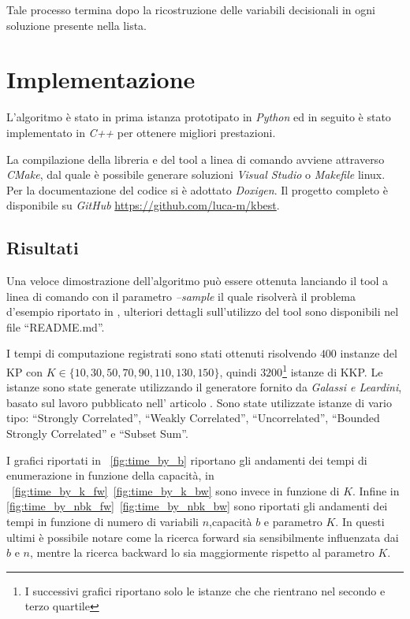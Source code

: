 \documentclass{llncs}
\newcommand{\labelsec}[1]{\label{sec:#1}}
\newcommand{\labelssec}[1]{\label{ssec:#1}}
\begin{document}
Tale processo termina dopo la ricostruzione delle variabili decisionali in ogni soluzione presente nella lista. 


\section{Implementazione}
\labelsec{implementazione}

L'algoritmo è stato in prima istanza prototipato in \emph{Python} ed in seguito è stato implementato in \emph{C++} per ottenere migliori prestazioni.

La compilazione della libreria e del tool a linea di comando avviene attraverso \emph{CMake}, dal quale è possibile generare soluzioni \emph{Visual Studio} o \emph{Makefile} linux. Per la documentazione del codice si è adottato \emph{Doxigen}. Il progetto completo è disponibile su \emph{GitHub} \url{https://github.com/luca-m/kbest}.

\subsection{Risultati}
\labelssec{risultati}

Una veloce dimostrazione dell'algoritmo può essere ottenuta lanciando il tool a linea di comando con il parametro \emph{--sample} il quale risolverà il problema d'esempio riportato in \cite{YANASSE2000}, ulteriori dettagli sull'utilizzo del tool sono disponibili nel file ``README.md''.

I tempi di computazione registrati sono stati ottenuti risolvendo $400$ instanze del KP con $K \in \{ 10,30,50,70,90,110,130,150 \}$, quindi $3200$\footnote{I successivi grafici riportano solo le istanze che che rientrano nel secondo e terzo quartile} istanze di KKP. Le istanze sono state generate utilizzando il generatore fornito da \emph{Galassi e Leardini}, basato sul lavoro pubblicato nell' articolo \cite{Pisinger94}. Sono state utilizzate istanze di vario tipo: ``Strongly Correlated'', ``Weakly Correlated'', ``Uncorrelated'', ``Bounded Strongly Correlated'' e ``Subset Sum''. 

I grafici riportati in ~\ref{fig:time_by_b} riportano gli andamenti dei tempi di enumerazione in funzione della capacità, in ~\ref{fig:time_by_k_fw}~\ref{fig:time_by_k_bw} sono invece in funzione di $K$. Infine in \ref{fig:time_by_nbk_fw}~\ref{fig:time_by_nbk_bw} sono riportati gli andamenti dei tempi in funzione di numero di variabili $n$,capacità $b$ e parametro $K$. In questi ultimi è possibile notare come la ricerca forward sia sensibilmente influenzata dai $b$ e $n$, mentre la ricerca backward lo sia maggiormente rispetto al parametro $K$.
\end{document}
